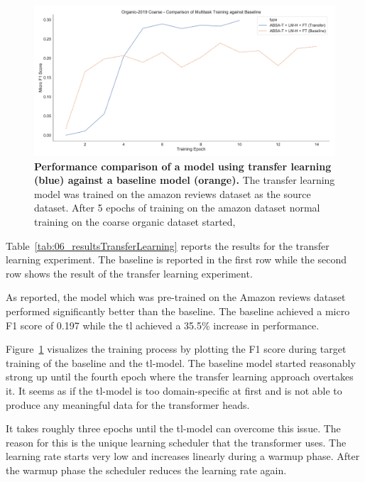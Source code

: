 \begin{figure}[htb]
    \centering
    \includegraphics[width=\textwidth]{figures/06_results/06_org_coarse_transfer}
    \caption{\textbf{Performance comparison of a model using transfer learning {(blue)} against a baseline model {(orange)}.} The transfer learning model was trained on the amazon reviews dataset as the source dataset. After 5 epochs of training on the amazon dataset normal training on the coarse organic dataset started,}
    \label{fig:06_org_coarse_transfer}
\end{figure}


Table~\ref{tab:06_resultsTransferLearning} reports the results for the transfer learning experiment. The baseline is reported in the first row while the second row shows the result of the transfer learning experiment. 
\medskip

As reported, the model which was pre-trained on the Amazon reviews dataset performed significantly better than the baseline. The baseline achieved a micro F1 score of 0.197 while the \gls{tl} achieved a 35.5\% increase in performance. 
\medskip

Figure~\ref{fig:06_org_coarse_transfer} visualizes the training process by plotting the F1 score during target training of the baseline and the \gls{tl}-model. The baseline model started reasonably strong up until the fourth epoch where the transfer learning approach overtakes it. It seems as if the \gls{tl}-model is too domain-specific at first and is not able to produce any meaningful data for the transformer heads.
\medskip

It takes roughly three epochs until the \gls{tl}-model can overcome this issue. The reason for this is the unique learning scheduler that the transformer uses. The learning rate starts very low and increases linearly during a warmup phase. After the warmup phase the scheduler reduces the learning rate again.
\medskip

